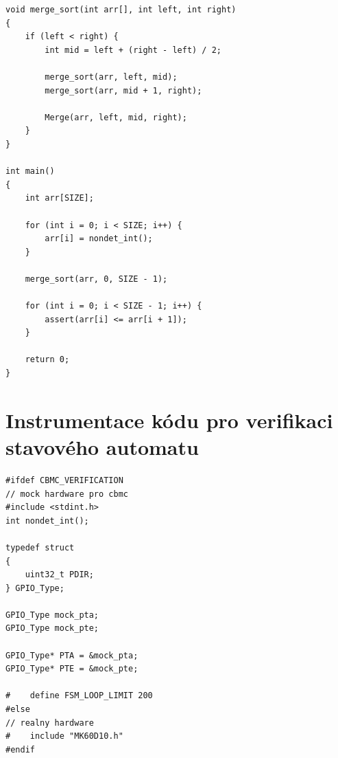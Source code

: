 \documentclass[a4paper, 11pt]{article}
\begin{document}
\begin{listing}[H]
    \ContinuedFloat
    \caption[]{Kód řadícího algoritmu Merge sort -- pokračování}
    \begin{verbatim}
void merge_sort(int arr[], int left, int right)
{
    if (left < right) {
        int mid = left + (right - left) / 2;

        merge_sort(arr, left, mid);
        merge_sort(arr, mid + 1, right);

        Merge(arr, left, mid, right);
    }
}

int main()
{
    int arr[SIZE];

    for (int i = 0; i < SIZE; i++) {
        arr[i] = nondet_int();
    }

    merge_sort(arr, 0, SIZE - 1);

    for (int i = 0; i < SIZE - 1; i++) {
        assert(arr[i] <= arr[i + 1]);
    }

    return 0;
}
    \end{verbatim}
\end{listing}

\pagebreak

\section{Instrumentace kódu pro verifikaci stavového automatu}\label{app:IMP_Instrumentation}

\begin{listing}[h]
    \caption{Instrumentovaná hlavička souboru \texttt{fsm.c} implementující logiku stavového automatu. Jsou vytvořeny falešné registry, které jsou poté v~rámci hlavní smyčky naplněny nedeterministickými hodnotami na začátku každé iterace.}
    \label{lst:IMP_FSM_Instrumentation}
    \begin{verbatim}
#ifdef CBMC_VERIFICATION
// mock hardware pro cbmc
#include <stdint.h>
int nondet_int();

typedef struct
{
    uint32_t PDIR;
} GPIO_Type;

GPIO_Type mock_pta;
GPIO_Type mock_pte;

GPIO_Type* PTA = &mock_pta;
GPIO_Type* PTE = &mock_pte;

#    define FSM_LOOP_LIMIT 200
#else
// realny hardware
#    include "MK60D10.h"
#endif
    \end{verbatim}
\end{listing}
\end{document}
